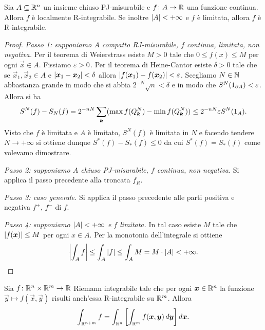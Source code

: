 \begin{theorem}
Sia $A\subseteq {\mathbb R}^n$ un insieme chiuso PJ-misurabile e $f\colon A \to {\mathbb R}$ una funzione 
continua. Allora $f$ è localmente R-integrabile. 
Se inoltre ${\left|A\right|}<+\infty$ e $f$ 
è limitata, allora $f$ è R-integrabile.
\end{theorem}
%
\begin{proof}
\emph{Passo 1: supponiamo $A$ compatto RJ-misurabile, 
$f$ continua, limitata, non negativa.}
Per il teorema di Weierstrass esiste $M>0$ tale che $0\le f(x) \le M$ per 
ogni $\vec x \in A$.
Fissiamo $\varepsilon>0$.
Per il teorema di Heine-Cantor esiste $\delta>0$ tale 
che se $\vec x_1,\vec x_2\in A$ e ${\left|\boldsymbol x_1 -\boldsymbol x_2\right|}<\delta$ 
allora ${\left|f(\boldsymbol x_1)-f(\boldsymbol x_2)\right|}< \varepsilon$. 
Scegliamo $N\in {\mathbb N}$ abbastanza grande in modo che si abbia $2^{-N}\sqrt n < \delta$
e in modo che $S^N(1_{\partial A})<\varepsilon$.
Allora si ha
\[
  S^N(f) - S_N(f) 
  = 2^{-nN}\sum_{\boldsymbol k} (\max f(Q^N_{\boldsymbol k})-\min f(Q^N_{\boldsymbol k})) 
  \le 2^{-nN}\varepsilon S^N(1_A).
\]
Visto che $f$ è limitata e $A$ è limitato, $S^N(f)$ è limitata in $N$ 
e facendo tendere $N\to+\infty$ si ottiene 
dunque $S^*(f)-S_*(f) \le 0$ da cui $S^*(f)=S_*(f)$ come volevamo dimostrare.

\emph{Passo 2: supponiamo $A$ chiuso PJ-misurabile, $f$ continua, non negativa.} 
Si applica il passo precedente alla troncata $f_R$.

\emph{Passo 3: caso generale.}
Si applica il passo precedente alle parti 
positiva e negativa $f^+$, $f^-$ di $f$.

\emph{Passo 4: supponiamo ${\left|A\right|}<+\infty$ e $f$ limitata.}  
In tal caso esiste $M$ tale che ${\left|f(\boldsymbol x)\right|}\le M$ per 
ogni $x\in A$. 
Per la monotonia dell'integrale si ottiene 
\[
  {\left|\int_A f\right|} 
  \le \int_A {\left|f\right|}
  \le \int_A M = M \cdot {\left|A\right|} < +\infty.  
\]
\end{proof}

\begin{theorem}
Sia $f\colon {\mathbb R}^n\times {\mathbb R}^m \to {\mathbb R}$ Riemann integrabile
tale che per ogni $\boldsymbol x\in {\mathbb R}^n$ la funzione $\vec y \mapsto f(\vec x,\vec y)$ 
risulti anch'essa R-integrabile su ${\mathbb R}^m$.
Allora 
\[
  \int_{{\mathbb R}^{n+m}} f = \int_{{\mathbb R}^n} {\left[ \int_{{\mathbb R}^m} f(\boldsymbol x, \boldsymbol y)\, d\boldsymbol y \right]}\, d\boldsymbol x.
\]
\end{theorem}


